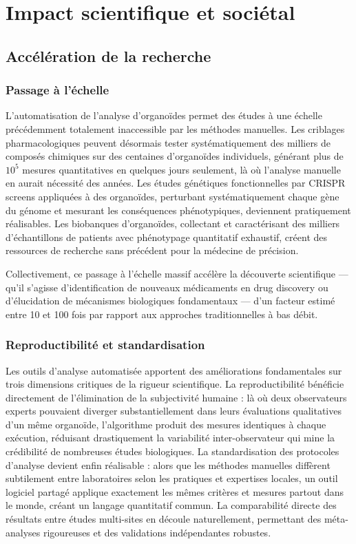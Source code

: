 \section{Impact scientifique et sociétal}

\subsection{Accélération de la recherche}

\subsubsection{Passage à l'échelle}

L'automatisation de l'analyse d'organoïdes permet des études à une échelle précédemment totalement inaccessible par les méthodes manuelles. Les criblages pharmacologiques peuvent désormais tester systématiquement des milliers de composés chimiques sur des centaines d'organoïdes individuels, générant plus de $10^5$ mesures quantitatives en quelques jours seulement, là où l'analyse manuelle en aurait nécessité des années. Les études génétiques fonctionnelles par CRISPR screens appliquées à des organoïdes, perturbant systématiquement chaque gène du génome et mesurant les conséquences phénotypiques, deviennent pratiquement réalisables. Les biobanques d'organoïdes, collectant et caractérisant des milliers d'échantillons de patients avec phénotypage quantitatif exhaustif, créent des ressources de recherche sans précédent pour la médecine de précision.

Collectivement, ce passage à l'échelle massif accélère la découverte scientifique — qu'il s'agisse d'identification de nouveaux médicaments en drug discovery ou d'élucidation de mécanismes biologiques fondamentaux — d'un facteur estimé entre 10 et 100 fois par rapport aux approches traditionnelles à bas débit.

\subsubsection{Reproductibilité et standardisation}

Les outils d'analyse automatisée apportent des améliorations fondamentales sur trois dimensions critiques de la rigueur scientifique. La reproductibilité bénéficie directement de l'élimination de la subjectivité humaine : là où deux observateurs experts pouvaient diverger substantiellement dans leurs évaluations qualitatives d'un même organoïde, l'algorithme produit des mesures identiques à chaque exécution, réduisant drastiquement la variabilité inter-observateur qui mine la crédibilité de nombreuses études biologiques. La standardisation des protocoles d'analyse devient enfin réalisable : alors que les méthodes manuelles diffèrent subtilement entre laboratoires selon les pratiques et expertises locales, un outil logiciel partagé applique exactement les mêmes critères et mesures partout dans le monde, créant un langage quantitatif commun. La comparabilité directe des résultats entre études multi-sites en découle naturellement, permettant des méta-analyses rigoureuses et des validations indépendantes robustes.

